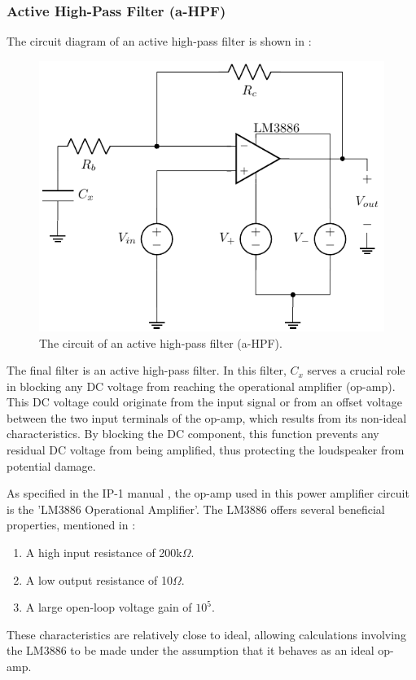 \subsubsection{Active High-Pass Filter (a-HPF)}
The circuit diagram of an active high-pass filter is shown in :
\begin{figure}[H]
    \centering
    \includegraphics[width=0.4\linewidth]{TU Delft Booming Bass Project Report/figures/PowerAmplifier/circuits/active_high_pass.pdf}
    \captionsetup{justification=raggedright, labelfont=bf}
    \caption{The circuit of an active high-pass filter (a-HPF).}
    \label{fig: pa active high pass}
\end{figure}

The final filter is an active high-pass filter. In this filter, $C_x$ serves a crucial role in blocking any DC voltage from reaching the operational amplifier (op-amp). This DC voltage could originate from the input signal or from an offset voltage between the two input terminals of the op-amp, which results from its non-ideal characteristics. By blocking the DC component, this function prevents any residual DC voltage from being amplified, thus protecting the loudspeaker from potential damage.

As specified in the IP-1 manual \cite{IP-manual}, the op-amp used in this power amplifier circuit is the 'LM3886 Operational Amplifier'. The LM3886 offers several beneficial properties, mentioned in \cite{IP-manual}:

\begin{enumerate}
    \item A high input resistance of 200k$\Omega$. 
    \item A low output resistance of 10$\Omega$. 
    \item A large open-loop voltage gain of $10^5$.
\end{enumerate}

These characteristics are relatively close to ideal, allowing calculations involving the LM3886 to be made under the assumption that it behaves as an ideal op-amp.

